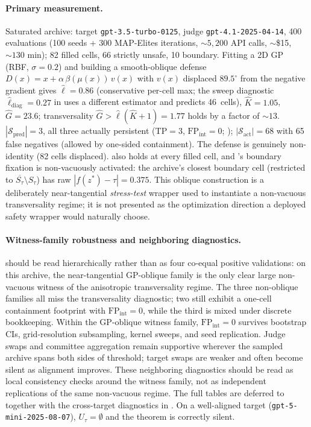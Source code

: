 \documentclass[11pt]{article}
\newcommand{\cl}[1]{\overline{#1}}
\begin{document}
\paragraph{Primary measurement.}
Saturated archive: target \texttt{gpt-3.5-turbo-0125}, judge
\texttt{gpt-4.1-2025-04-14}, 400 evaluations (100 seeds + 300
MAP-Elites iterations, $\sim 5{,}200$ API calls, $\sim$\$15,
$\sim 130$ min); 82 filled cells, 66 strictly unsafe, 10 boundary.
Fitting a 2D GP (RBF, $\sigma=0.2$) and building a smooth-oblique
defense $D(x) = x + \alpha\,\beta(\mu(x))\,v(x)$ with $v(x)$ displaced
$89.5^\circ$ from the negative gradient gives
$\hat\ell = 0.86$ (conservative per-cell max; the sweep diagnostic
$\hat\ell_{\mathrm{diag}}=0.27$ in  uses a
different estimator and predicts 46~cells),
$\hat K = 1.05$, $\hat G = 23.6$; transversality
$\hat G > \hat\ell(\hat K{+}1) = 1.77$ holds by a factor of $\sim13$.
$|\mathcal{S}_{\text{pred}}| = 3$, all three actually persistent
($\mathrm{TP}=3$, $\mathrm{FP}_{\mathrm{int}}=0$;
); $|\mathcal{S}_{\text{act}}| = 68$
with 65 false negatives (allowed by one-sided containment). The defense
is genuinely non-identity (82 cells displaced). 
also holds at every filled cell, and 's boundary
fixation is non-vacuously activated: the archive's closest boundary
cell (restricted to $\cl{S_\tau}\setminus S_\tau$) has raw
$|f(z^*)-\tau| = 0.375$.
This oblique construction is a deliberately near-tangential
\emph{stress-test} wrapper used to instantiate a non-vacuous
transversality regime; it is not presented as the optimization
direction a deployed safety wrapper would naturally choose.

\paragraph{Witness-family robustness and neighboring diagnostics.}
 should be read hierarchically rather than
as four co-equal positive validations: on this archive, the
near-tangential GP-oblique family is the only clear large non-vacuous
witness of the anisotropic transversality regime. The three non-oblique
families all miss the transversality diagnostic; two still exhibit a
one-cell containment footprint with $\mathrm{FP}_{\mathrm{int}}=0$,
while the third is mixed under discrete bookkeeping. Within the
GP-oblique witness family,
$\mathrm{FP}_{\mathrm{int}}=0$ survives bootstrap CIs, grid-resolution
subsampling, kernel sweeps, and seed replication. Judge swaps and
committee aggregation remain supportive wherever the sampled archive
spans both sides of threshold; target swaps are weaker and often become
silent as alignment improves. These neighboring diagnostics should be
read as local consistency checks around the witness family, not as
independent replications of the same non-vacuous regime. The full
tables are deferred to
 together with the
cross-target diagnostics in . On a
well-aligned target (\texttt{gpt-5-mini-2025-08-07}), $U_\tau=\emptyset$
and the theorem is correctly silent.
\end{document}
